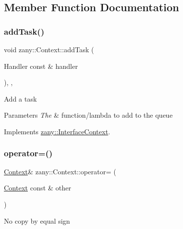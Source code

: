 \subsection{Member Function Documentation}
\mbox{\label{classzany_1_1_context_a448dcb8a627491eb4c8de0f46cd13ab1}} 
\subsubsection{\texorpdfstring{add\+Task()}{addTask()}}
{\footnotesize\ttfamily void zany\+::\+Context\+::add\+Task (\begin{DoxyParamCaption}\item[{Handler const \&}]{handler }\end{DoxyParamCaption})\hspace{0.3cm}{\ttfamily [inline]}, {\ttfamily [final]}, {\ttfamily [virtual]}}

Add a task


\begin{DoxyParams}{Parameters}
{\em The} & function/lambda to add to the queue \\
\hline
\end{DoxyParams}


Implements \hyperlink{classzany_1_1_interface_context_a56da6cf74ba78321a0ebe0b334175176}{zany\+::\+Interface\+Context}.

\mbox{\label{classzany_1_1_context_a35af38bc82dcac073aa0dbc0acca032d}} 
\subsubsection{\texorpdfstring{operator=()}{operator=()}}
{\footnotesize\ttfamily \hyperlink{classzany_1_1_context}{Context}\& zany\+::\+Context\+::operator= (\begin{DoxyParamCaption}\item[{\hyperlink{classzany_1_1_context}{Context} const \&}]{other }\end{DoxyParamCaption})\hspace{0.3cm}{\ttfamily [delete]}}

No copy by equal sign \mbox{\label{classzany_1_1_context_af7642e436736dbe466c476b56435d90f}} 
